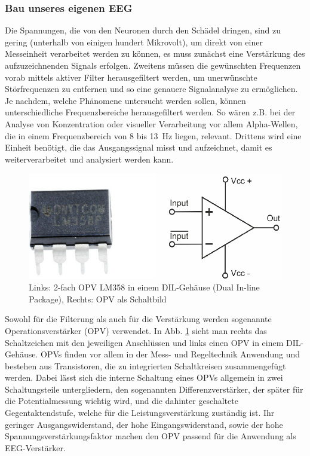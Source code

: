 \documentclass[10pt]{article}
\begin{document}
\subsubsection{Bau unseres eigenen EEG} \label{section:UnserEEG}
 
Die Spannungen, die von den Neuronen durch den Schädel dringen, sind zu gering (unterhalb von einigen hundert Mikrovolt), um direkt von einer Messeinheit verarbeitet werden zu können, es muss zunächst eine Verstärkung des aufzuzeichnenden Signals erfolgen. \cite{EEGHausarbeit}
Zweitens müssen die gewünschten Frequenzen vorab mittels aktiver Filter herausgefiltert werden, um unerwünschte Störfrequenzen zu entfernen und so eine genauere Signalanalyse zu ermöglichen.
Je nachdem, welche Phänomene untersucht werden sollen, können unterschiedliche Frequenzbereiche herausgefiltert werden. 
So wären z.B. bei der Analyse von Konzentration oder visueller Verarbeitung vor allem Alpha-Wellen, die in einem Frequenzbereich von 8 bis \SI{13}{\hertz} liegen, relevant. \cite{Praktikum, Birbaumer2010, wiki:Berger-Effekt}
 Drittens wird eine Einheit benötigt, die das Ausgangssignal misst und aufzeichnet, damit es weiterverarbeitet und analysiert werden kann. 
 

 
\begin{figure}[h!]
    \centering
    \includegraphics[width=0.6\linewidth]{pictures/OPV.png}
    \caption{Links: 2-fach OPV LM358 in einem DIL-Gehäuse (Dual In-line Package), Rechts: OPV als Schaltbild }
    \label{fig:OPV}
\end{figure}

Sowohl für die Filterung als auch für die Verstärkung werden sogenannte Operationsverstärker (OPV) verwendet. 
In Abb. \ref{fig:OPV} sieht man rechts das Schaltzeichen mit den jeweiligen Anschlüssen und links einen OPV in einem DIL-Gehäuse. 
OPVs finden vor allem in der Mess- und Regeltechnik Anwendung und bestehen aus Transistoren, die zu integrierten Schaltkreisen zusammengefügt werden.
Dabei lässt sich die interne Schaltung eines OPVs allgemein in zwei Schaltungsteile untergliedern, den sogenannten Differenzverstärker, der später für die Potentialmessung wichtig wird, und die dahinter geschaltete Gegentaktendstufe, welche für die Leistungsverstärkung zuständig ist.
Ihr geringer Ausgangswiderstand, der hohe Eingangswiderstand, sowie der hohe Spannungsverstärkungsfaktor machen den OPV passend für die Anwendung als EEG-Verstärker.
\end{document}
